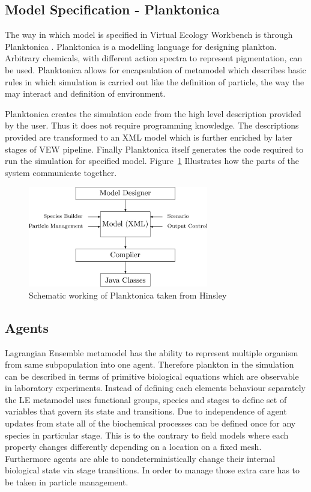 \documentclass[12pt, a4paper]{report}
\begin{document}
\subsection{Model Specification - Planktonica}\label{subsec:planktonica}
The way in which model is specified in Virtual Ecology Workbench is through
Planktonica \cite{Planktonica}. Planktonica is a modelling language for
designing plankton. Arbitrary chemicals, with different action spectra to
represent pigmentation, can be used. Planktonica allows for encapsulation of
metamodel which describes basic rules in which simulation is carried out
like the definition of particle, the way the may interact and definition
of environment.

Planktonica creates the simulation code from the high level description
provided by the user. Thus it does not require programming knowledge.
The descriptions provided are transformed to an XML model which is
further enriched by later stages of VEW pipeline. Finally Planktonica
itself generates the code required to run the simulation for specified
model. Figure~\ref{fig:planktonica} Illustrates how the parts of the system
communicate together.

\begin{figure}[H]
  \centering
  \includegraphics[width=0.7\textwidth,natwidth=1080,natheight=604]{images/planktonica.jpg}
  \caption{Schematic working of Planktonica taken from Hinsley \cite{Planktonica}}
  \label{fig:planktonica}
\end{figure}

\subsection{Agents}\label{subsec:agents}
Lagrangian Ensemble metamodel has the ability to represent
multiple organism from same subpopulation into one agent.
Therefore plankton in the simulation can be described in
terms of primitive biological equations which are
observable in laboratory experiments. Instead of defining
each elements behaviour separately the LE metamodel uses
functional groups, species and stages to define set of
variables that govern its state and transitions.
Due to independence of agent updates from state all of the
biochemical processes can be defined once for any species
in particular stage. This is to the contrary to field models
where each property changes differently depending on a location
on a fixed mesh\cite{Woods200543}. Furthermore agents are able to
nondeterministically change their internal biological
state via stage transitions. In order to manage
those extra care has to be taken in particle management.
\end{document}
